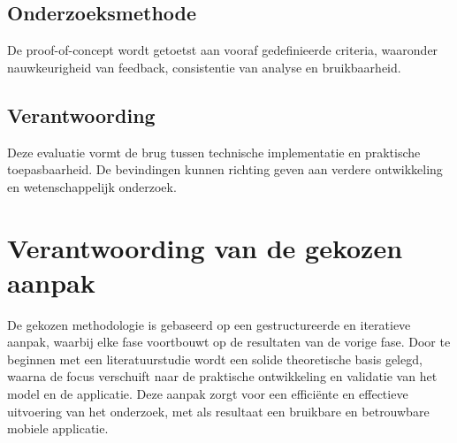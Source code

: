\subsection{Onderzoeksmethode}
De proof-of-concept wordt getoetst aan vooraf gedefinieerde criteria, waaronder nauwkeurigheid van feedback, consistentie van analyse en bruikbaarheid. 

\subsection{Verantwoording}
Deze evaluatie vormt de brug tussen technische implementatie en praktische toepasbaarheid. 
De bevindingen kunnen richting geven aan verdere ontwikkeling en wetenschappelijk onderzoek.

\section{Verantwoording van de gekozen aanpak}
De gekozen methodologie is gebaseerd op een gestructureerde en iteratieve aanpak, waarbij elke fase voortbouwt op de resultaten van de vorige fase. Door te beginnen met een literatuurstudie wordt een solide theoretische basis gelegd, waarna de focus verschuift naar de praktische ontwikkeling en validatie van het model en de applicatie. Deze aanpak zorgt voor een efficiënte en effectieve uitvoering van het onderzoek, met als resultaat een bruikbare en betrouwbare mobiele applicatie.

